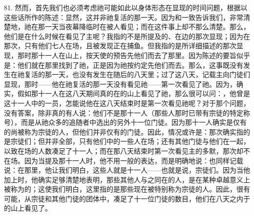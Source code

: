81. 然而，首先我们也必须考虑祂可能如此以身体形态在显现的时间问题，根据以这些话所作的陈述：显然，这并非祂复活的那一天。因为和一致告诉我们，非常清楚地，祂在那一天当夜幕降临时在被人看见；而在这件事上却不那么清楚。那么，他们是在什么时候在看见了主呢？我指的不是所提及的、在边的那次显现；因为在那次，只有他们七人在场，且被发现正在捕鱼。但我指的是所详细描述的那次显现，那时那十一人在山上，按天使的预告先他们而去了那里。因为陈述的要旨似乎是：他们就在那里找到了祂，正是因为祂按约定先他们而去。那么，这事既没有发生在祂复活的那一天，也没有发生在随后的八天里；过了这八天，记载主向门徒们显现，那时——他在祂复活的那一天没有看见祂——第一次看见了祂。因为，确实，假如那十一人在这八天期间真的在的山上看见了祂，那么很可以问：，他曾是这十一人中的一员，怎能说他在这八天结束时是第一次看见祂呢？对于那个问题，没有答案，除非真的有人说：他们不是那十一人（那些人那时已带有宗徒的特定称号），而是从祂众多的追随者中选出的另外十一位门徒。因为那十一人确实是仅有的尚被称为宗徒的人，但他们并非仅有的门徒。因此，情况或许是：那次确实指的是宗徒们；但并非全部，只有他们中的一些人在场；还有其他门徒与他们在一起，以致在场的人数凑足了十一人；而在那八天结束时第一次看见主的多默，那次却不在场。因为当提及那十一人时，他不用一般的表达，而是明确地说：也同样记载说：在那里，他让我们明白，这些人就是十一人——也就是说，宗徒们。因为当他加上时，他确实足够清楚地表明，那些其他人与之同在的人，是在某种卓越意义上被称为的；这使我们明白，这里指的是那些现在被特别称为宗徒的人。因此，很有可能，从宗徒和其他门徒的团体中，凑足了十一位门徒的数目，他们在八天之内于的山上看见了。\par

